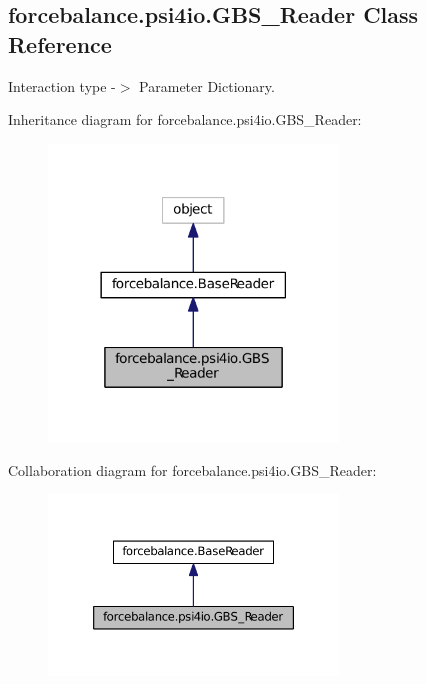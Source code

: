 \hypertarget{classforcebalance_1_1psi4io_1_1GBS__Reader}{\subsection{forcebalance.\-psi4io.\-G\-B\-S\-\_\-\-Reader Class Reference}
\label{classforcebalance_1_1psi4io_1_1GBS__Reader}
}


Interaction type -\/$>$ Parameter Dictionary.  




Inheritance diagram for forcebalance.\-psi4io.\-G\-B\-S\-\_\-\-Reader\-:\nopagebreak
\begin{figure}[H]
\begin{center}
\leavevmode
\includegraphics[width=218pt]{classforcebalance_1_1psi4io_1_1GBS__Reader__inherit__graph}
\end{center}
\end{figure}


Collaboration diagram for forcebalance.\-psi4io.\-G\-B\-S\-\_\-\-Reader\-:\nopagebreak
\begin{figure}[H]
\begin{center}
\leavevmode
\includegraphics[width=218pt]{classforcebalance_1_1psi4io_1_1GBS__Reader__coll__graph}
\end{center}
\end{figure}
